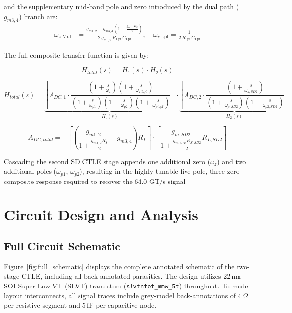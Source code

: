 \noindent and the supplementary mid-band pole and zero introduced by the dual path ($g_{m3,4}$) branch are:
\begin{align*}
    \omega_{z\_\mathrm{Mul}} &= \frac{g_{m1,2}-g_{m3,4}\!\left(1+\frac{g_{m1,2}R_s}{2}\right)}
                                    {2\,g_{m1,2}\,R_{\mathrm{Lpf}}\,C_{\mathrm{Lpf}}},
    \quad
    \omega_{p\_\mathrm{Lpf}} = \frac{1}{2\,R_{\mathrm{Lpf}}\,C_{\mathrm{Lpf}}}
\end{align*}

\noindent The full composite transfer function is given by:

\begin{equation*}
    H_{total}(s) = H_1(s) \cdot H_2(s)
\end{equation*}

\begin{equation*}
    H_{total}(s) = \underbrace{\left[ A_{DC,1} \cdot \frac{(1+\frac{s}{\omega_z})(1+\frac{s}{\omega_{z\_\mathrm{Lpf}}})}{(1+\frac{s}{\omega_{p1}})(1+\frac{s}{\omega_{p2}})(1+\frac{s}{\omega_{p\_\mathrm{Lpf}}})} \right]}_{H_1(s)} \cdot \underbrace{\left[ A_{DC,2} \cdot \frac{(1+\frac{s}{\omega_{z,SD2}})}{(1+\frac{s}{\omega_{p,SD2}})(1+\frac{s}{\omega_{p2,SD2}})} \right]}_{H_2(s)}
\end{equation*}

\begin{equation*}
    A_{DC,total} = -\left[ \left(\frac{g_{m1,2}}{1+\frac{g_{m1,2}R_S}{2}} - g_{m3,4}\right)R_L \right] \cdot \left[ \frac{g_{m,SD2}}{1+\frac{g_{m,SD2}R_{S,SD2}}{2}} R_{L,SD2} \right]
\end{equation*} 
\newline

\noindent Cascading the second SD CTLE stage appends one additional zero ($\omega_z$) and two additional poles ($\omega_{p1}$, $\omega_{p2}$), resulting in the highly tunable five-pole, three-zero composite response required to recover the 64.0 GT/s signal.


\section*{Circuit Design and Analysis}

\subsection{Full Circuit Schematic}

Figure~\ref{fig:full_schematic} displays the complete annotated schematic of the two-stage CTLE, including all back-annotated parasitics. The design utilizes 22\,nm SOI Super-Low VT (SLVT) transistors (\texttt{slvtnfet\_mmw\_5t}) throughout. To model layout interconnects, all signal traces include grey-model back-annotations of $4\,\Omega$ per resistive segment and $5\,\text{fF}$ per capacitive node.

